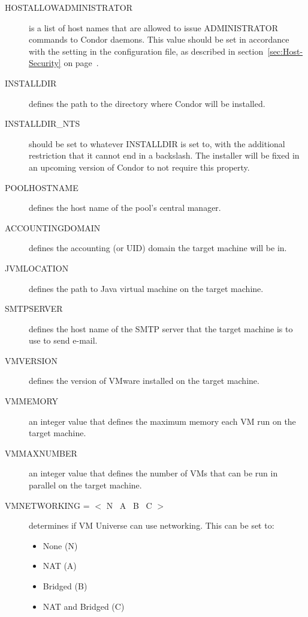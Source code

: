 \begin{description}
\item[HOSTALLOWADMINISTRATOR]
is a list of host names that are allowed to issue ADMINISTRATOR commands to
Condor daemons. This value should be set in accordance with the
 setting in the configuration file, 
as described in
section~\ref{sec:Host-Security} on page~\pageref{sec:Host-Security}.

\item[INSTALLDIR]
defines the path to the directory where Condor will be installed. 

\item[INSTALLDIR\_NTS]
should be set to whatever INSTALLDIR is set to, with the additional
restriction that it cannot end in a backslash. The installer will be fixed
in an upcoming version of Condor to not require this property.

\item[POOLHOSTNAME]
defines the host name of the pool's central manager. 

\item[ACCOUNTINGDOMAIN] 
defines the accounting (or UID) domain the target machine will be in.

\item[JVMLOCATION]
defines the path to Java virtual machine on the target machine.

\item[SMTPSERVER]
defines the host name of the SMTP server that the target machine is to
use to send e-mail.

\item [VMVERSION]
defines the version of VMware installed on the target machine.

\item [VMMEMORY]
an integer value that defines the maximum memory each VM run on the target
machine.

\item [VMMAXNUMBER]
an integer value that defines the number of VMs that can be run in parallel
on the target machine.

\item [VMNETWORKING = $<$ N \Bar\ A \Bar\ B \Bar\ C $>$]
determines if VM Universe can use networking. This can be set to:
\begin{itemize}
\item None (N)
\item NAT (A)
\item Bridged (B)
\item NAT and Bridged (C)
\end{itemize}


\end{description}
